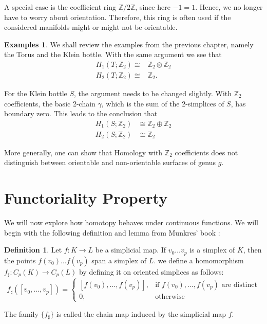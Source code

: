 \documentclass[toc=bib]{scrartcl}
\theoremstyle{plain}
\theoremstyle{definition}
\newtheorem	{definition}[theorem]{Definition}
\newtheorem{examples}[theorem]{Examples}
\theoremstyle{remark}
\newcommand{\isom}{\cong}
\newcommand{\Z}{\mathbb{Z}}
\begin{document}
A special case is the coefficient ring $\Z/2\Z$, since here $-1=1$. Hence, we no longer have to worry about orientation. Therefore, this ring is often used if the considered manifolds might or might not be orientable.


\begin{examples}
	We shall review the examples from the previous chapter, namely the Torus and the Klein bottle. With the same argument we see that
	\begin{align*}
		H_1(T;\Z_2)\isom& \Z_2\otimes\Z_2\\
		H_2(T;\Z_2)\isom& \Z_2.
	\end{align*}
	
	For the Klein bottle $S$, the argument needs to be changed slightly. With $\Z_2$ coefficients, the basic 2-chain $\gamma$, which is the sum of the 2-simplices of $S$, has boundary zero. This leads to the conclusion that 
	\begin{align*}
		H_1(S;\Z_2)&\isom \Z_2\oplus \Z_2\\
		H_2(S;\Z_2)&\isom \Z_2
	\end{align*}

	More generally, one can show that Homology with $\Z_2$ coefficients does not distinguish between orientable and non-orientable surfaces of genus $g$.
\end{examples}


\section{Functoriality Property}
We will now explore how homotopy behaves under continuous functions. We will begin with the following definition and lemma from Munkres' book \cite[lemma 12.1, p. 62]{mu}:

\begin{definition}
	Let $f: K\to L$ be a simplicial map. If $v_0\dots v_p$ is a simplex of $K$, then the points $f(v_0)\dots f(v_p)$ span a simplex of $L$. we define a homomorphism $f_\sharp: C_p(K)\to C_p(L)$ by defining it on oriented simplices as follows:
	\[
	f_\sharp([v_0,\dots,v_p])=\begin{cases}
	[f(v_0),\dots, f(v_p)],& \text{if } f(v_0),\dots, f(v_p) \text{ are distinct}\\
	0,&\text{otherwise}
	\end{cases}
	\]
	
	The family $\{f_\sharp\}$ is called the chain map induced by the simplicial map $f$.
\end{definition}
\end{document}
